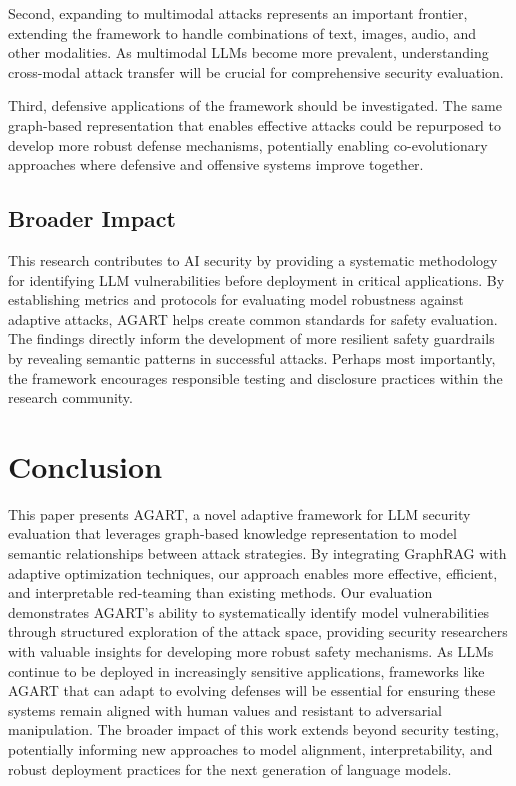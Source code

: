 Second, expanding to multimodal attacks represents an important frontier, extending the framework to handle combinations of text, images, audio, and other modalities. As multimodal LLMs become more prevalent, understanding cross-modal attack transfer will be crucial for comprehensive security evaluation.

Third, defensive applications of the framework should be investigated. The same graph-based representation that enables effective attacks could be repurposed to develop more robust defense mechanisms, potentially enabling co-evolutionary approaches where defensive and offensive systems improve together.

\subsection{Broader Impact}
This research contributes to AI security by providing a systematic methodology for identifying LLM vulnerabilities before deployment in critical applications. By establishing metrics and protocols for evaluating model robustness against adaptive attacks, AGART helps create common standards for safety evaluation. The findings directly inform the development of more resilient safety guardrails by revealing semantic patterns in successful attacks. Perhaps most importantly, the framework encourages responsible testing and disclosure practices within the research community.

\section{Conclusion}
This paper presents AGART, a novel adaptive framework for LLM security evaluation that leverages graph-based knowledge representation to model semantic relationships between attack strategies. By integrating GraphRAG with adaptive optimization techniques, our approach enables more effective, efficient, and interpretable red-teaming than existing methods. Our evaluation demonstrates AGART's ability to systematically identify model vulnerabilities through structured exploration of the attack space, providing security researchers with valuable insights for developing more robust safety mechanisms. As LLMs continue to be deployed in increasingly sensitive applications, frameworks like AGART that can adapt to evolving defenses will be essential for ensuring these systems remain aligned with human values and resistant to adversarial manipulation. The broader impact of this work extends beyond security testing, potentially informing new approaches to model alignment, interpretability, and robust deployment practices for the next generation of language models. 